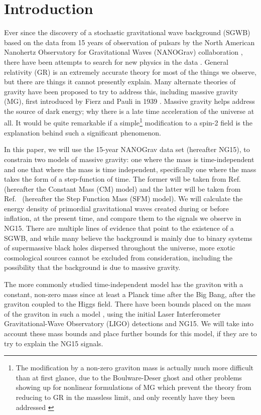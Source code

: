 \documentclass[prd,twocolumn,aps,psfig,nofootinbib,nobibnotes,superscriptaddress,preprintnumbers,times]{revtex4-2}
\begin{document}
\section{Introduction}
Ever since the discovery of a stochastic gravitational wave background (SGWB) based on the data from 15 years of observation of pulsars by the North American Nanohertz Observatory for Gravitational Waves (NANOGrav) collaboration \cite{Agazie:2023}, there have been attempts to search for new physics in the data \cite{Afzal:2023}. General relativity (GR) is an extremely accurate theory for most of the things we observe, but there are things it cannot presently explain. Many alternate theories of gravity have been proposed to try to address this, including massive gravity (MG), first introduced by Fierz and Pauli in 1939 \cite{Fierz:1939ix}. Massive gravity helps address the source of dark energy; why there is a late time acceleration of the universe at all. It would be quite remarkable if a simple\footnote{The modification by a non-zero graviton mass is actually much more difficult than at first glance, due to the Boulware-Deser ghost and other problems showing up for nonlinear formulations of MG which prevent the theory from reducing to GR in the massless limit, and only recently have they been addressed \cite{Hassan:2012a, Hassan:2012b}} modification to a spin-2 field is the explanation behind such a significant phenomenon. 

In this paper, we will use the 15-year NANOGrav data set (hereafter NG15), to constrain two models of massive gravity: one where the mass is time-independent and one that where the mass is time independent, specifically one where the mass takes the form of a step-function of time. The former will be taken from Ref.\ \cite{Gumrukcuoglu:2012} (hereafter the Constant Mass (CM) model) and the latter will be taken from Ref.\ \cite{Fujita:2018} (hereafter the Step Function Mass (SFM) model). We will calculate the energy density of primordial gravitational waves created during or before inflation, at the present time, and compare them to the signals we observe in NG15. There are multiple lines of evidence that point to the existence of a SGWB, and while many believe the background is mainly due to binary systems of supermassive black holes dispersed throughout the universe, more exotic cosmological sources cannot be excluded  from consideration\cite{Agazie:2023}, including the possibility that the background is due to massive gravity. 

The more commonly studied time-independent model has the graviton with a constant, non-zero mass since at least a Planck time after the Big Bang, after the graviton coupled to the Higgs field. There have been bounds placed on the mass of the graviton in such a model \cite{deRham:2017,Wang:2023, Wu:2023}, using the initial Laser Interferometer Gravitational-Wave Observatory (LIGO) detections and NG15. We will take into account these mass bounds and place further bounds for this model, if they are to try to explain the NG15 signals.
\end{document}
